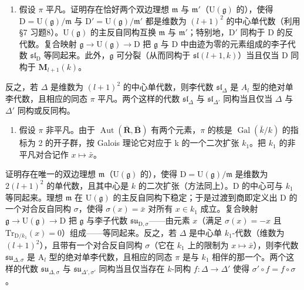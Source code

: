 \begin{enumerate}
\def\labelenumi{\alph{enumi})}
\tightlist
\item
  假设 \(\pi\) 平凡。证明存在恰好两个双边理想 \(\mathfrak{m}\) 与 \(\mathfrak{m}'\)（\(\mathrm{U}(\mathfrak{g})\) 的），使得 \(\mathrm{D} = \mathrm{U}(\mathfrak{g}) / \mathfrak{m}\) 与 \(\mathrm{D}' = \mathrm{U}(\mathfrak{g}) / \mathfrak{m}'\) 都是维数为 \((l + 1)^2\) 的中心单代数（利用 §7 习题8）。\(\mathrm{U}(\mathfrak{g})\) 的主反自同构互换 \(\mathfrak{m}\) 与 \(\mathfrak{m}'\)；特别地，\(\mathrm{D}'\) 同构于 D 的反代数。复合映射 \(\mathfrak{g} \to \mathrm{U}(\mathfrak{g}) \to \mathrm{D}\) 把 \(\mathfrak{g}\) 与 D 中由迹为零的元素组成的李子代数 \(\mathfrak{sl}_{\mathrm{D}}\) 等同起来。此外，\(\mathfrak{g}\) 可分裂（从而同构于 \(\mathfrak{sl}(l + 1,k)\)）当且仅当 D 同构于 \(\mathbf{M}_{l + 1}(k)\)。
\end{enumerate}

反之，若 \(\Delta\) 是维数为 \((l + 1)^2\) 的中心单代数，则李代数 \(\mathfrak{sl}_{\Delta}\) 是 \(A_l\) 型的绝对单李代数，且相应的同态 \(\pi\) 平凡。两个这样的代数 \(\mathfrak{sl}_{\Delta}\) 与 \(\mathfrak{sl}_{\Delta'}\) 同构当且仅当 \(\Delta\) 与 \(\Delta'\) 同构或反同构。

\begin{enumerate}
\def\labelenumi{\alph{enumi})}
\setcounter{enumi}{1}
\tightlist
\item
  假设 \(\pi\) 非平凡。由于 \(\operatorname{Aut}(\bar{\mathbf{R}},\bar{\mathbf{B}})\) 有两个元素，\(\pi\) 的核是 \(\operatorname{Gal}(\bar{k}/k)\) 的指标为 2 的开子群，按 Galois 理论它对应于 k 的一个二次扩张 \(k_{1}\)。把 \(k_{1}\) 的非平凡对合记作 \(x\mapsto\bar{x}\)。
\end{enumerate}

证明存在唯一的双边理想 \(\mathfrak{m}\)（\(\mathrm{U}(\mathfrak{g})\) 的），使得 \(\mathrm{D} = \mathrm{U}(\mathfrak{g}) / \mathfrak{m}\) 是维数为 \(2(l + 1)^2\) 的单代数，且其中心是 \(k\) 的二次扩张（方法同上）。D 的中心可与 \(k_{1}\) 等同起来。理想 \(\mathfrak{m}\) 在 \(\mathrm{U}(\mathfrak{g})\) 的主反自同构下稳定；于是过渡到商即定义出 D 的一个对合反自同构 \(\sigma\)，使得 \(\sigma(x) = \bar{x}\) 对所有 \(x \in k_{1}\) 成立。复合映射 \(\mathfrak{g} \to \mathrm{U}(\mathfrak{g}) \to \mathrm{D}\) 把 \(\mathfrak{g}\) 与李子代数 \(\mathfrak{s}\mathfrak{u}_{\mathrm{D},\sigma}\)——由元素 \(x\)（满足 \(\sigma(x) = -x\) 且 \(\mathrm{Tr}_{\mathrm{D}/k_1}(x) = 0\)）组成——等同起来。反之，若 \(\Delta\) 是中心单 \(k_{1}\)-代数（维数为 \((l + 1)^2\)），且带有一个对合反自同构 \(\sigma\)（它在 \(k_{1}\) 上的限制为 \(x \mapsto \bar{x}\)），则李代数 \(\mathfrak{s}\mathfrak{u}_{\Delta,\sigma}\) 是 \(\mathrm{A}_l\) 型的绝对单李代数，且相应的同态 \(\pi\) 是与 \(k_{1}\) 相伴的那一个。两个这样的代数 \(\mathfrak{s}\mathfrak{u}_{\Delta,\sigma}\) 与 \(\mathfrak{s}\mathfrak{u}_{\Delta',\sigma'}\) 同构当且仅当存在 \(k\)-同构 \(f: \Delta \to \Delta'\) 使得 \(\sigma' \circ f = f \circ \sigma\)。

